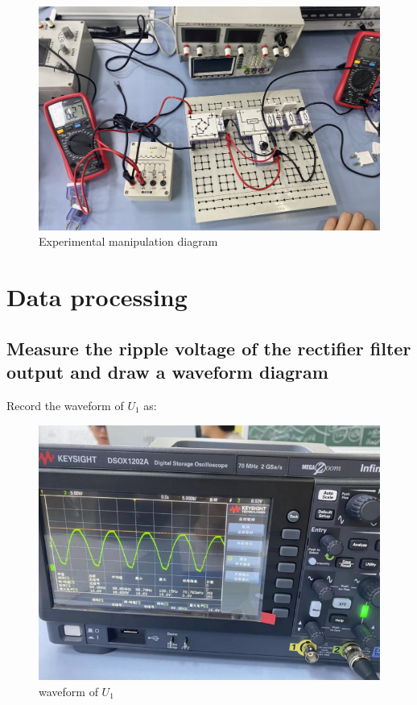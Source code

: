 \documentclass[UTF8]{article}
\begin{document}
    	\begin{figure}[H]
    	    	\centering
    	    	\includegraphics[clip,scale=0.5,trim={0 0 0 0}]{fig/fig14.png}
    	        \caption{Experimental manipulation diagram}
    	        \label{figure.14}
        \end{figure}      
	
	\section{Data processing}
   \subsection{Measure the ripple voltage of the rectifier filter output and draw a waveform diagram}
   Record the waveform of $U_1$ as:
   
   	\begin{figure}[H]
       	    	\centering
       	    	\includegraphics[clip,scale=1,trim={0 0 0 0}]{fig/fig20.png}
       	        \caption{waveform of $U_1$}
       	        \label{figure.14}
           \end{figure}      
   
\end{document}
